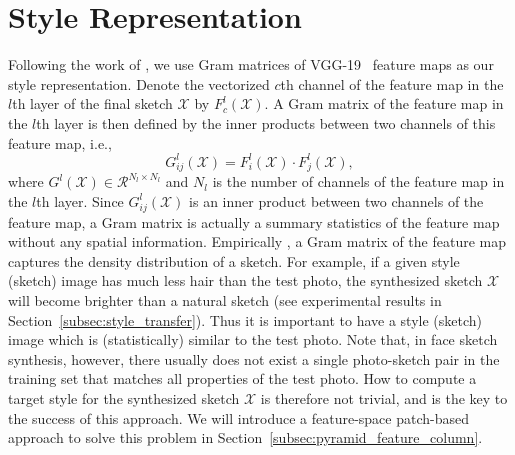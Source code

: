 \documentclass[10pt,twocolumn,letterpaper]{article}
\begin{document}
\section{Style Representation}\label{sec:motivation}
Following the work of \cite{gatys2015neural}, we use Gram matrices of VGG-19~\cite{simonyan2014very} feature maps as our style representation. Denote the vectorized $c$th channel of the feature map in the $l$th layer of the final sketch $\mathcal{X}$ by $F^{l}_{c}(\mathcal{X})$. A Gram matrix of the feature map in the $l$th layer is then defined by the inner products between two channels of this feature map, i.e.,
\begin{equation}
G^l_{ij}(\mathcal{X}) = F^l_{i}(\mathcal{X}) \cdot F^l_{j}(\mathcal{X}), %
\label{eq:Gram_element}
\end{equation}
where $G^l(\mathcal{X}) \in {\mathcal{R}^{N_l \times N_l}}$ %
and $N_l$ is the number of channels of the feature map in the $l$th layer. Since $G^l_{ij}(\mathcal{X})$ is an inner product between two channels of the feature map, a Gram matrix is actually a summary statistics of the feature map without any spatial information. Empirically , a Gram matrix of the feature map captures the density distribution of a sketch. For example, if a given style (sketch) image has much less hair than the test photo, the synthesized sketch $\mathcal{X}$ will become brighter than a natural sketch (see experimental results in Section~\ref{subsec:style_transfer}). Thus it is important to have a style (sketch) image which is (statistically) similar to the test photo. Note that, in face sketch synthesis, however, there usually does not exist a single photo-sketch pair in the training set that matches all properties of the test photo. How to compute a target style for the synthesized sketch $\mathcal{X}$ is therefore not trivial, and is the key to the success of this approach. We will introduce a feature-space patch-based approach to solve this problem in Section~\ref{subsec:pyramid_feature_column}.

\end{document}
